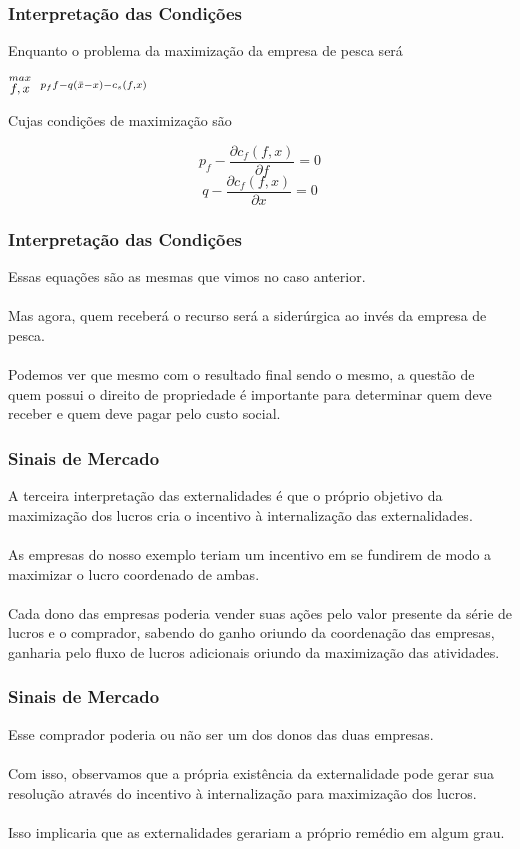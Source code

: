 \documentclass{beamer}[10]
\begin{document}
\begin{frame}
	\frametitle{Interpretação das Condições}

	Enquanto o problema da maximização da empresa de pesca será

	\begin{center}
		\LARGE $ \stackrel{max}{\text{\small $f,x$}} \ \ %
		\stackrel{p_ff - q(\bar{x} - x) - c_s(f,x)}{\ } $ %
	\end{center}

	Cujas condições de maximização são

	$$ p_f - \frac{\partial c_f(f,x)}{\partial f} = 0 $$
	$$ q - \frac{\partial c_f(f,x)}{\partial x} = 0 $$

\end{frame}

\begin{frame}
	\frametitle{Interpretação das Condições}

	Essas equações são as mesmas que vimos no caso anterior.
	\\~\\
	Mas agora, quem receberá o recurso será a siderúrgica ao invés da empresa de pesca.
	\\~\\
	Podemos ver que mesmo com o resultado final sendo o mesmo, a questão de quem possui o direito de propriedade é importante para determinar quem deve receber e quem deve pagar pelo custo social.

\end{frame}

\begin{frame}
	\frametitle{Sinais de Mercado}

	A terceira interpretação das externalidades é que o próprio objetivo da maximização dos lucros cria o incentivo à internalização das externalidades.
	\\~\\
	As empresas do nosso exemplo teriam um incentivo em se fundirem de modo a maximizar o lucro coordenado de ambas.
	\\~\\
	Cada dono das empresas poderia vender suas ações pelo valor presente da série de lucros e o comprador, sabendo do ganho oriundo da coordenação das empresas, ganharia pelo fluxo de lucros adicionais oriundo da maximização das atividades.

\end{frame}

\begin{frame}
	\frametitle{Sinais de Mercado}

	Esse comprador poderia ou não ser um dos donos das duas empresas.
	\\~\\
	Com isso, observamos que a própria existência da externalidade pode gerar sua resolução através do incentivo à internalização para maximização dos lucros.
	\\~\\
	Isso implicaria que as externalidades gerariam a próprio remédio em algum grau.

\end{frame}
\end{document}
